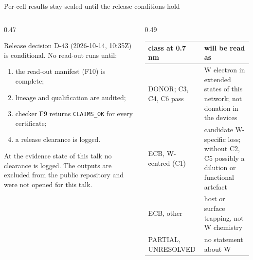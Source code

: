 \begin{frame}{Per-cell results stay sealed until the release conditions hold}
  \elevenTop\elevendense
  \begin{columns}[T,onlytextwidth]
    \begin{column}{0.47\textwidth}
      {\footnotesize Release decision D-43 (2026-10-14, 10:35Z) is conditional. No read-out runs until:\par}
      \vspace{-0.8mm}
      \begin{enumerate}
        \item the read-out manifest (F10) is complete;
        \item lineage and qualification are audited;
        \item checker F9 returns \texttt{CLAIMS\_OK} for every certificate;
        \item a release clearance is logged.
      \end{enumerate}
      {\footnotesize At the evidence state of this talk no clearance is logged. The outputs are excluded from the
        public repository and were not opened for this talk.\par}
      \vspace{0.6mm}
    \end{column}
    \begin{column}{0.49\textwidth}
      \begingroup\scriptsize
      \renewcommand{\arraystretch}{1.1}
      \begin{tabularx}{\linewidth}{@{}>{\raggedright\arraybackslash}p{2.85cm}>{\raggedright\arraybackslash}X@{}}
        \toprule
        class at 0.7\,nm & will be read as \\
        \midrule
        DONOR; C3, C4, C6 pass & W electron in extended states of this network; not donation in the devices \\
        ECB, W-centred (C1) & candidate W-specific loss; without C2, C5 possibly a dilution or functional
          artefact \\
        ECB, other & host or surface trapping, not W chemistry \\
        PARTIAL, UNRESOLVED & no statement about W \\
        \bottomrule
      \end{tabularx}\par\endgroup

\end{column}
\end{columns}
\end{frame}
